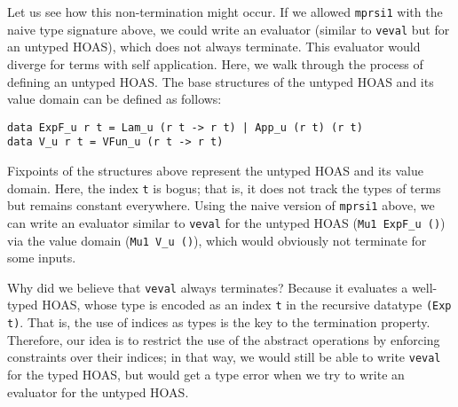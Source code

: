 Let us see how this non-termination might occur. If we allowed
\lstinline{mprsi1} with the naive type signature above, we could write
an evaluator (similar to \lstinline{veval} but for an untyped HOAS),
which does not always terminate. This evaluator would diverge for terms
with self application.
Here, we walk through the process of defining an untyped HOAS.
The base structures of the untyped HOAS and its value domain
can be defined as follows:
\begin{lstlisting}
data ExpF_u r t = Lam_u (r t -> r t) | App_u (r t) (r t)
data V_u r t = VFun_u (r t -> r t)
\end{lstlisting}
Fixpoints of the structures above represent the untyped HOAS and
its value domain. Here, the index \lstinline{t} is bogus; that is,
it does not track the types of terms but remains constant everywhere.
Using the naive version of \lstinline{mprsi1} above, we can write an evaluator
similar to \lstinline{veval} for the untyped HOAS (\lstinline{Mu1 ExpF_u ()})
via the value domain (\lstinline{Mu1 V_u ()}), which would obviously
not terminate for some inputs.

Why did we believe that \lstinline{veval} always terminates?
Because it evaluates a well-typed HOAS, whose type is encoded as
an index \lstinline{t} in the recursive datatype \lstinline{(Exp t)}. That is,
the use of indices as types is the key to the termination property.
Therefore, our idea is to restrict the use of the abstract operations
by enforcing constraints over their indices; in that way, 
we would still be able to write \lstinline{veval} for the typed HOAS,
but would get a type error when we try to write an evaluator for
the untyped HOAS.


